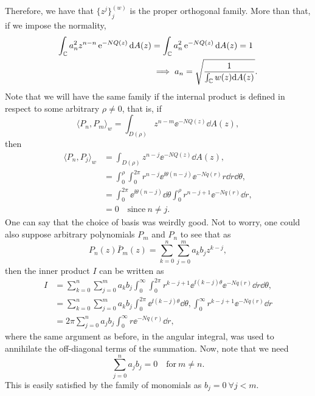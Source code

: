 Therefore, we have that $\{z^j\}_j^{(w)}$ is the proper orthogonal family. More than that, if we impose the normality,
\begin{align}
	\int_{\mathbb{C}} a_n^2 z^{n-n} \operatorname{e}^{-N Q(z)} \mathrm{d} A(z) & = \int_{\mathbb{C}} a_n^2 \operatorname{e}^{-N Q(z)} \mathrm{d} A(z) = 1 \\
	& \implies a_n = \sqrt{\frac{1}{\int_{\mathbb{C}} w(z) \mathrm{d} A(z)}}.
\end{align}
Note that we will have the same family if the internal product is defined in respect to some arbitrary $\rho \neq 0$, that is, if
\begin{equation}
		\langle P_n, P_m \rangle_w = \int_{D(\rho)} z^{n-m} \ee^{-N Q(z)} \dd A(z),
\end{equation}
then
\begin{align}
	\langle P_n, P_{j} \rangle_w & = \int_{D(\rho)} z^{n-j} \ee^{-N Q(z)} \dd A(z), \\
	& = \int_{0}^{\rho} \int_{0}^{2\pi} r^{n-j} \ee^{\ii \theta (n - j)} \ee^{-N q(r)} r \dd r \dd \theta, \\
	& = \int_{0}^{2\pi} \ee^{\ii \theta (n - j)} \dd \theta \int_{0}^{\rho} r^{n-j+1} \ee^{-N q(r)} \dd r, \\
	& = 0 \quad \text{since} \  n \neq j.
\end{align}
One can say that the choice of basis was weirdly good. Not to worry, one could also suppose arbitrary polynomials $P_m$ and $P_n$ to see that as
\begin{equation}
	P_n(z) \bar{P}_m(z) = \sum_{k=0}^{n}\sum_{j=0}^{m} a_k b_j z^{k - j},
\end{equation}
then the inner product $I$ can be written as
\begin{align}
	I & = \sum_{k=0}^{n}\sum_{j=0}^{m} a_k b_j  \int_{0}^{\infty} \int_{0}^{2\pi}  r^{k - j + 1} \ee^{\ii (k - j) \theta} \ee^{-N q(r)} \dd r \dd \theta, \\
	& = \sum_{k=0}^{n}\sum_{j=0}^{m} a_k b_j  \int_{0}^{2\pi}  \ee^{\ii (k - j) \theta} \dd \theta, \int_{0}^{\infty} r^{k - j + 1} \ee^{-N q(r)} \dd r \\
	& = 2\pi  \sum_{j=0}^{n} a_j b_j \int_{0}^{\infty} r \ee^{-N q(r)} \dd r,
\end{align}
where the same argument as before, in the angular integral, was used to annihilate the off-diagonal terms of the summation. Now, note that we need 
\begin{equation}
	 \sum_{j=0}^{n} a_j b_j  = 0 \quad \text{for} \ m \neq n.
\end{equation}
This is easily satisfied by the family of monomials as $b_j = 0 \ \forall j < m$.